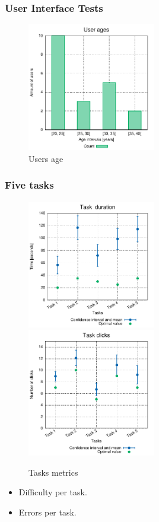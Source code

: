 \documentclass[compress]{beamer}
\begin{document}
	\begin{frame}[c]
		\frametitle{User Interface Tests}
		\begin{figure}[H]
			\includegraphics[width=0.5\textwidth]{figures/user_ages.pdf}
			\caption{Users age}
		\end{figure}
	\end{frame}
	\begin{frame}[c]
		\frametitle{Five tasks}
		\begin{figure}[H]
			\includegraphics[width=0.5\textwidth]{figures/user_times.pdf}
			\includegraphics[width=0.5\textwidth]{figures/user_clicks.pdf}
			\caption{Tasks metrics}
		\end{figure}
		\begin{itemize}
			\item Difficulty per task.
			\item Errors per task.
		\end{itemize}
	\end{frame}
\end{document}
